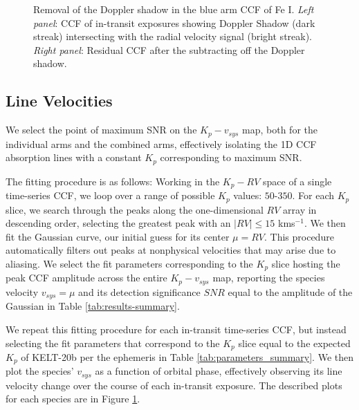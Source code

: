 \documentclass[twocolumn]{aastex631}
\begin{document}
\begin{figure}[ht!]
 \caption{Removal of the Doppler shadow in the blue arm CCF of Fe I. \textit{Left panel}: CCF of in-transit exposures showing Doppler Shadow (dark streak) intersecting with the radial velocity signal (bright streak). \textit{Right panel}: Residual CCF after the subtracting off the Doppler shadow.
}
    \label{fig:main-CCFs}

    \end{figure}
            
    \subsection{Line Velocities}\label{subsec:Line Velocities}
        We select the point of maximum SNR on the ${K_p-v_{sys}}$ map, both for the individual arms and the combined arms, effectively isolating the 1D CCF absorption lines with a constant ${K_p}$ corresponding to maximum SNR.

        The fitting procedure is as follows: Working in the ${K_p-RV}$ space of a single time-series CCF, we loop over a range of possible $K_p$ values: $50$-$350$. For each $K_p$ slice, we search through the peaks along the one-dimensional $RV$ array in descending order, selecting the greatest peak with an $|RV| \leq 15$ kms$^{-1}$. We then fit the Gaussian curve, our initial guess for its center $\mu = RV$. This procedure automatically filters out peaks at nonphysical velocities that may arise due to aliasing.
        We select the fit parameters corresponding to the $K_p$ slice hosting the peak CCF amplitude across the entire $K_p-v_{sys}$ map, reporting the species velocity $v_{sys} = \mu$ and its detection significance $SNR$ equal to the amplitude of the Gaussian in Table \ref{tab:results-summary}.
        
        We repeat this fitting procedure for each in-transit time-series CCF, but instead selecting the fit parameters that correspond to the $K_p$ slice equal to the expected $K_p$ of KELT-20b per the ephemeris in Table \ref{tab:parameters_summary}. We then plot the species' $v_{sys}$ as a function of orbital phase, effectively observing its line velocity change over the course of each in-transit exposure. The described plots for each species are in Figure \ref{fig:main-CCFs}. 
\end{document}
